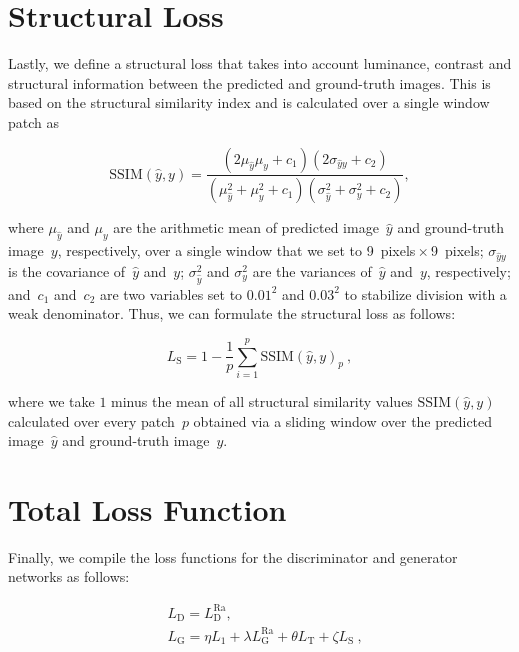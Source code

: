 \section{Structural Loss}

Lastly, we define a structural loss that takes into account luminance, contrast and structural information between the predicted and ground-truth images.
This is based on the structural similarity index \citep[SSIM;][]{WangImageQualityAssessment2004} and is calculated over a single window patch as

\begin{equation}\label{eq:A6}
  \text{SSIM} (\hat{y}, y) = \dfrac{(2\mu_{\hat{y}}\mu_y + c_1)(2\sigma_{{\hat{y}}y} + c_2)}{(\mu_{\hat{y}}^2 + \mu_y^2 + c_1)(\sigma_{\hat{y}}^2 + \sigma_y^2 + c_2)},
\end{equation}

where $\mu_{\hat{y}}$ and $\mu_y$ are the arithmetic mean of predicted image~${\hat{y}}$ and ground-truth image~$y$, respectively, over a single window that we set to 9~pixels\,$\times$\,9~pixels; $\sigma_{{\hat{y}}y}$ is the covariance of~${\hat{y}}$ and~$y$; $\sigma_{\hat{y}}^2$ and $\sigma_y^2$ are the variances of~${\hat{y}}$ and~$y$, respectively; and~$c_1$ and~$c_2$ are two variables set to $0.01^2$ and $0.03^2$ to stabilize division with a weak denominator.
Thus, we can formulate the structural loss as follows:

\begin{equation}\label{eq:A7}
  L_{\mathrm{S}} = 1 - \dfrac{1}{p} \sum\limits_{i=1}^p \text{SSIM} (\hat{y}, y)_p~,
\end{equation}

where we take $1$ minus the mean of all structural similarity values $\text{SSIM}(\hat{y}, y)$ calculated over every patch~$p$ obtained via a sliding window over the predicted image~${\hat{y}}$ and ground-truth image~$y$.

\section{Total Loss Function}

Finally, we compile the loss functions for the discriminator and generator networks as follows:

\begin{align}
  & L_{\mathrm{D}} = L_{\mathrm{D}}^{\text{Ra}}, \label{eq:A8}\\
  & L_{\mathrm{G}} = \eta L_1 + \lambda L_{\mathrm{G}}^{\text{Ra}} + \theta L_{\mathrm{T}} + \zeta L_{\mathrm{S}}~, \label{eq:A9}
\end{align}


